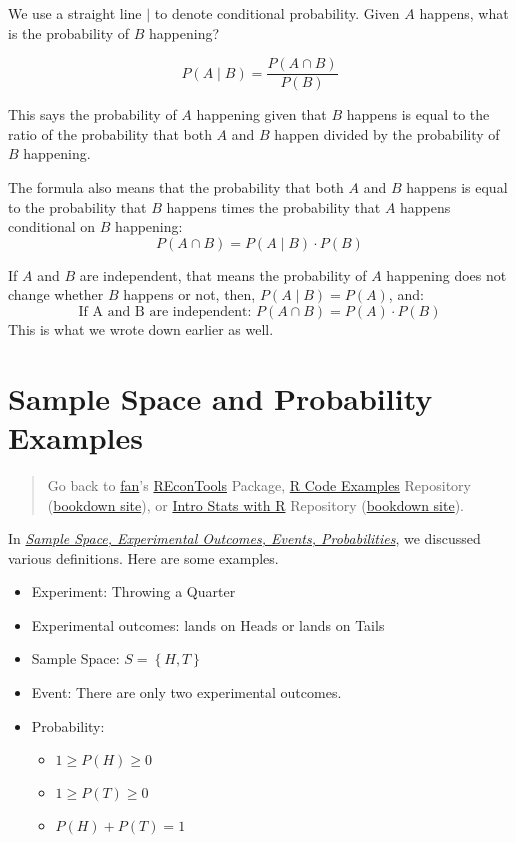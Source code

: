 \documentclass[
]{book}
\providecommand{\tightlist}{%
  \setlength{\itemsep}{0pt}\setlength{\parskip}{0pt}}
\begin{document}
We use a straight line \(\mid\) to denote conditional probability. Given \(A\) happens, what is the probability of \(B\) happening?

\[P (A \mid B) = \frac{P(A \cap B)}{P(B)}\]

This says the probability of \(A\) happening given that \(B\) happens is equal to the ratio of the probability that both \(A\) and \(B\) happen divided by the probability of \(B\) happening.

The formula also means that the probability that both \(A\) and \(B\) happens is equal to the probability that \(B\) happens times the probability that \(A\) happens conditional on \(B\) happening:
\[ P(A \cap B) = P (A \mid B)\cdot P(B)\]

If \(A\) and \(B\) are independent, that means the probability of \(A\) happening does not change whether \(B\) happens or not, then, \(P (A \mid B) = P(A)\), and:
\[ \text{If A and B are independent: } P(A \cap B) = P(A) \cdot P(B)\]
This is what we wrote down earlier as well.

\hypertarget{sample-space-and-probability-examples}{%
\section{Sample Space and Probability Examples}\label{sample-space-and-probability-examples}}

\begin{quote}
Go back to \href{http://fanwangecon.github.io/}{fan}'s \href{https://fanwangecon.github.io/REconTools/}{REconTools} Package, \href{https://fanwangecon.github.io/R4Econ/}{R Code Examples} Repository (\href{https://fanwangecon.github.io/R4Econ/bookdown}{bookdown site}), or \href{https://fanwangecon.github.io/Stat4Econ/}{Intro Stats with R} Repository (\href{https://fanwangecon.github.io/Stat4Econ/bookdown}{bookdown site}).
\end{quote}

In \emph{\href{https://fanwangecon.github.io/Stat4Econ/probability/htmlpdfr/samplespace.html}{Sample Space, Experimental Outcomes, Events, Probabilities}}, we discussed various definitions. Here are some examples.

\begin{itemize}
\tightlist
\item
  Experiment: Throwing a Quarter
\item
  Experimental outcomes: lands on Heads or lands on Tails
\item
  Sample Space: \(S=\left\{H, T\right\}\)
\item
  Event: There are only two experimental outcomes.
\item
  Probability:

  \begin{itemize}
  \tightlist
  \item
    \(1 \ge P(H) \ge 0\)
  \item
    \(1 \ge P(T) \ge 0\)
  \item
    \(P(H) + P(T) = 1\)
  \end{itemize}
\end{itemize}
\end{document}
